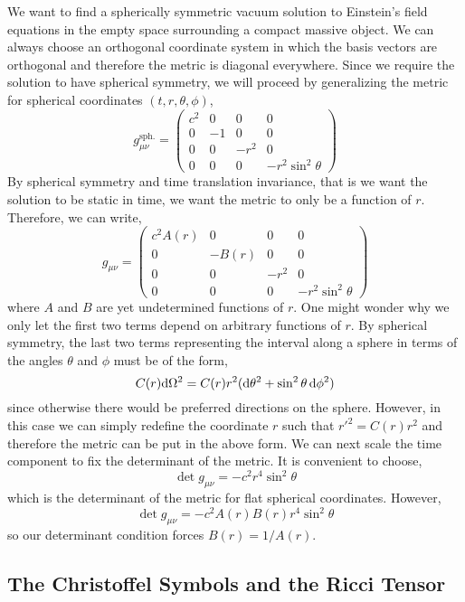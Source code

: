 \documentclass[11pt, a4paper]{article}
\begin{document}
We want to find a spherically symmetric vacuum solution to Einstein's field equations in the empty space surrounding a compact massive object. We can always choose an orthogonal coordinate system in which the basis vectors are orthogonal and therefore the metric is diagonal everywhere. Since we require the solution to have spherical symmetry, we will proceed by generalizing the metric for spherical coordinates $(t, r, \theta, \phi)$,
\[ g^{\mathrm{sph.}}_{\mu \nu}
= 
\begin{pmatrix}
c^2 & 0 & 0 & 0 \\
0 & -1 & 0 & 0 \\
0 & 0 & - r^2 & 0 \\
0 & 0 & 0 & - r^2 \sin^2{\theta}
\end{pmatrix}
\]
By spherical symmetry and time translation invariance, that is we want the solution to be static in time, we want the metric to only be a function of $r$. Therefore, we can write,
\[ g_{\mu \nu}
= 
\begin{pmatrix}
c^2 A(r) & 0 & 0 & 0 \\
0 & -B(r) & 0 & 0 \\
0 & 0 & - r^2 & 0 \\
0 & 0 & 0 & - r^2 \sin^2{\theta}
\end{pmatrix}
\]
where $A$ and $B$ are yet undetermined functions of $r$. One might wonder why we only let the first two terms depend on arbitrary functions of $r$. By spherical symmetry, the last two terms representing the interval along a sphere in terms of the angles $\theta$ and $\phi$ must be of the form, 
\[C(r) \mathrm{d}\Omega^2 = C(r) r^2 ( \mathrm{d}\theta^2 + \sin^2{\theta} \, \mathrm{d}\phi^2)\] 
since otherwise there would be preferred directions on the sphere. However, in this case we can simply redefine the coordinate $r$ such that $r'^2 = C(r) r^2$ and therefore the metric can be put in the above form. We can next scale the time component to fix the determinant of the metric. It is convenient to choose,
\[ \det{g_{\mu \nu}} = - c^2 r^4 \sin^2{\theta} \]
which is the determinant of the metric for flat spherical coordinates. However,
\[ \det{g_{\mu \nu}} = - c^2 A(r) B(r) r^4 \sin^2{\theta} \]
so our determinant condition forces $B(r) = 1/A(r)$. 

\subsection{The Christoffel Symbols and the Ricci Tensor}
\end{document}
